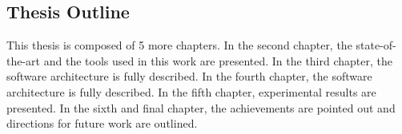 


\subsection{Thesis Outline}

This thesis is composed of 5 more chapters. In the second chapter, the state-of-the-art and the tools used in this work are presented. In the third chapter, the software architecture is fully described. In the fourth chapter, the software architecture is fully described. In the fifth chapter, experimental results are presented. In the sixth and final chapter, the achievements are pointed out and directions for future work are outlined.
